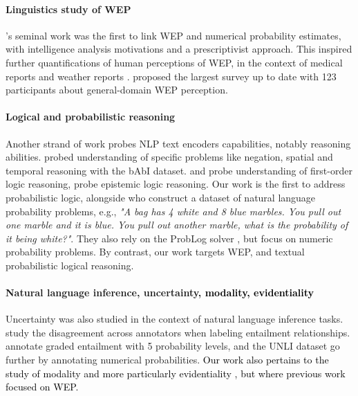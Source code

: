 \documentclass[11pt]{article}
\def \thecolor {black}
\newcommand{\blue}[1]{\textcolor{\thecolor}{#1}}
\begin{document}
\paragraph{Linguistics study of WEP} \citet{kent1964words}'s seminal work was the first to link WEP and numerical probability estimates, with intelligence analysis motivations \citep{dhami2021words} and a prescriptivist approach. This inspired further quantifications of human perceptions of WEP, in the context of medical reports \citep{OBrien1989WordsON, ott2021words} and weather reports \citep{lenhardt2020likely}. \citet{fagen-ulmschneider} proposed  the largest survey up to date with 123 participants about general-domain WEP perception. 
\vspace{-0.1cm}

\paragraph{Logical and probabilistic reasoning} Another strand of work probes NLP text encoders capabilities, notably reasoning abilities. \citet{weston2015towards} probed understanding of specific problems like negation, spatial and temporal reasoning with the bAbI dataset. \citet{richardson2020probing} and \citet{han2022folio} probe understanding of first-order logic reasoning, \citet{sileo2023mindgames} probe epistemic logic reasoning. Our work is the first to address probabilistic logic, alongside \citet{ijcai2017-0556,suster-etal-2021-mapping} who construct a dataset of natural language probability problems, e.g., \textit{"A bag has 4 white and 8 blue marbles. You pull out one marble and it is blue. You pull out another marble, what is the probability of it being white?"}. They also rely on the ProbLog solver \citep{de2007problog}, but focus on numeric probability problems. By contrast, our work targets WEP, and textual probabilistic logical reasoning.

\paragraph{Natural language inference, uncertainty, \blue{modality, evidentiality}}
Uncertainty was also studied in the context of natural language inference tasks. \citet{xzhou2022distnli} study the disagreement across annotators when labeling entailment relationships. \citet{ordinal-common-sense-inference} annotate graded entailment with 5 probability levels, and the UNLI dataset \citep{chen-etal-2020-uncertain} go further by annotating numerical probabilities.
\blue{
Our work also pertains to the study of modality \cite{modality, modalityannotation} and more particularly evidentiality \cite{su-etal-2010-evidentiality}, but where previous work focused on WEP.}
\end{document}

